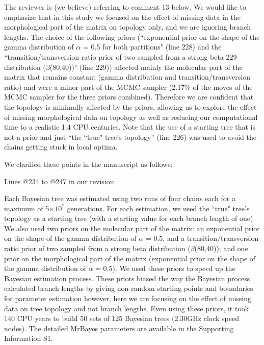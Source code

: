 \documentclass[11pt]{letter}
\begin{document}
\begin{letter}{}
The reviewer is (we believe) referring to comment 13 below. We would like to emphasize that in this study we focused on the effect of missing data in the morphological part of the matrix on topology only, and we are ignoring branch lengths. The choice of the following priors (``exponential prior on the shape of the gamma distribution of $\alpha$ = 0.5 for both partitions" (line 228) and the ``transition/transversion ratio prior of two sampled from a strong beta 229 distribution ($\beta$(80,40))" (line 229)) affected mainly the molecular part of the matrix that remains constant (gamma distribution and transition/transversion ratio) and were a minor part of the MCMC sampler (2.17\% of the moves of the MCMC sampler for the three priors combined). Therefore we are confident that the topology is minimally affected by the priors, allowing us to explore the effect of missing morphological data on topology as well as reducing our computational time to a realistic 1.4 CPU centuries. Note that the use of a starting tree that is not a prior and just ``the ``true" tree's topology'' (line 226) was used to avoid the chains getting stuck in local optima.

We clarified these points in the manuscript as follows:

Lines @234 to @247 in our revision:

\hfill\begin{minipage}{\dimexpr\textwidth-1cm}
Each Bayesian tree was estimated using two runs of four chains each for a maximum of 5$\times$$10^7$ generations. For each estimation, we used the ``true" tree's topology as a starting tree (with a starting value for each branch length of one). We also used two priors on the molecular part of the matrix: an exponential prior on the shape of the gamma distribution of $\alpha$ = 0.5, and a transition/transversion ratio prior of two sampled from a strong beta distribution ($\beta$(80,40)); and one prior on the morphological part of the matrix (exponential prior on the shape of the gamma distribution of $\alpha$ = 0.5). We used these priors to speed up the Bayesian estimation process. These priors biased the way the Bayesian process calculated branch lengths by giving non-random starting points and boundaries for parameter estimation however, here we are focusing on the effect of missing data on tree topology and not branch lengths. Even using these priors, it took $~$ 140 CPU years to build 50 sets of 125 Bayesian trees (2.30GHz clock speed nodes). The detailed MrBayes parameters are available in the Supporting Information S1.
\end{minipage}


\end{letter}
\end{document}
